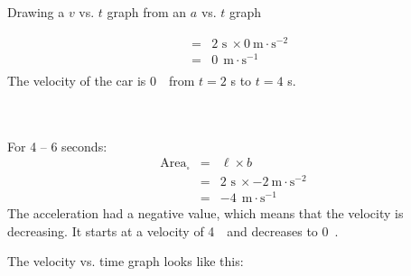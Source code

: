 \begin{wex}{Drawing a $v$ vs. $t$ graph from an $a$ vs. $t$ graph}
{\begin{minipage}{0.3\textwidth}
\begin{eqnarray*}
&=& 2\text{~s}\ \times 0~\text{m}\cdot \text{s}^{-2}\\
&=&0\ ~\text{m}\cdot \text{s}^{-1}\\
\end{eqnarray*}
The velocity of the car is 0~\ms ~from $t=2$ s to $t=4$ s.\\
\\
\\
\end{minipage}
\begin{minipage}{0.03\textwidth}
\begin{center}
\end{center}
\end{minipage}
\begin{minipage}{0.3\textwidth}
For 4 -- 6 seconds:
\begin{eqnarray*}
\text{Area}_{\square} &=& \ell \times b\\
&=& 2\text{~s}\ \times -2~\text{m}\cdot \text{s}^{-2}\ \\
&=&-4\ ~\text{m}\cdot \text{s}^{-1}
\end{eqnarray*}
The acceleration had a negative value, which means that the velocity is decreasing. It starts at a velocity of 4~\ms ~and decreases to 0~\ms.\\
\end{minipage}
\begin{minipage}{0.3\textwidth}
The velocity vs. time graph looks like this:
\end{minipage}
\begin{minipage}{0.7\textwidth}
\begin{center}
\end{center}
\end{minipage}
}
\end{wex}
    \noindent
   \label{m38795*secfhsst!!!underscore!!!id3332}
